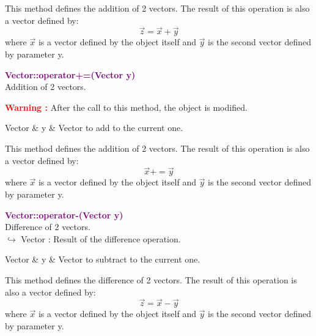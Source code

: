 This method defines the addition of 2 vectors.
The result of this operation is also a vector defined by:
\begin{equation*}
\overrightarrow{z}=\overrightarrow{x}+\overrightarrow{y}
\end{equation*}
where $\overrightarrow{x}$ is a vector defined by the object itself and $\overrightarrow{y}$ is the second vector defined by parameter y.

\textcolor{purple}{\textbf{Vector::operator+=(Vector y)}}\label{Vector::operator+=(Vector y)}\\
Addition of 2 vectors.

\hspace*{10mm}\textcolor{red}{\textbf{Warning :}} After the call to this method, the object is modified.

\begin{tcolorbox}[width=\textwidth,myArgs,tabularx={ll|R}]
Vector & y & Vector to add to the current one.
\end{tcolorbox}

This method defines the addition of 2 vectors.
The result of this operation is also a vector defined by:
\begin{equation*}
\overrightarrow{x}+=\overrightarrow{y}
\end{equation*}
where $\overrightarrow{x}$ is a vector defined by the object itself and $\overrightarrow{y}$ is the second vector defined by parameter y.

\textcolor{purple}{\textbf{Vector::operator-(Vector y)}}\label{Vector::operator-(Vector y)}\\
Difference of 2 vectors.\\ \hspace*{10mm}$\hookrightarrow$ Vector : Result of the difference operation.

\begin{tcolorbox}[width=\textwidth,myArgs,tabularx={ll|R}]
Vector & y & Vector to subtract to the current one.
\end{tcolorbox}

This method defines the difference of 2 vectors.
The result of this operation is also a vector defined by:
\begin{equation*}
\overrightarrow{z}=\overrightarrow{x}-\overrightarrow{y}
\end{equation*}
where $\overrightarrow{x}$ is a vector defined by the object itself and $\overrightarrow{y}$ is the second vector defined by parameter y.

